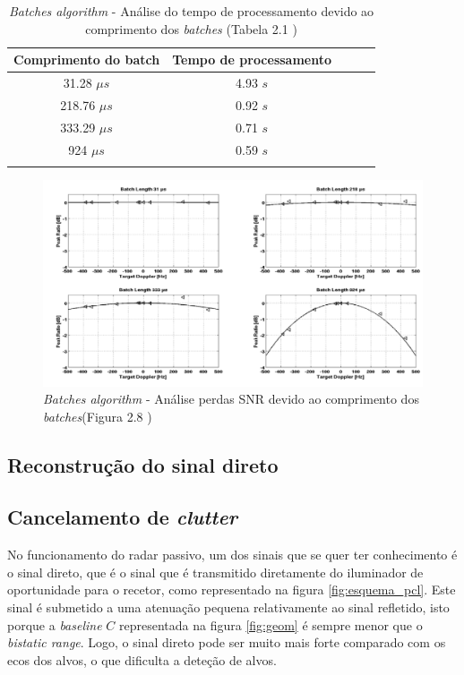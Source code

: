 \begin{table}[h]
\centering
\begin{tabular}{@{}ccccc@{}}
\toprule
Comprimento do batch & Tempo de processamento  \\ \midrule
31.28 $\mu s$        & 4.93 $s$                \\
218.76 $\mu s$       & 0.92 $s$                \\
333.29 $\mu s$       & 0.71 $s$                \\ 
924 $\mu s$          & 0.59 $s$                \\ \bottomrule
\label{tab:Tempo de processamento}
\end{tabular}
\caption[\textit{Batches algorithm} - tempo de processamento]{\textit{Batches algorithm} - Análise do tempo de processamento devido ao comprimento dos \textit{batches} (Tabela 2.1 \cite{Martorella})}
\end{table}

\begin{figure}[h]
\centering
\includegraphics[scale=0.5]{chapters/ch2/assets/bat_snr}
\caption[Perdas SNR]{\textit{Batches algorithm} - Análise perdas \gls{SNR} devido ao comprimento dos \textit{batches}(Figura 2.8 \cite{Martorella})}
\label{fig:bat_snr}
\end{figure}


\subsection{Reconstrução do sinal direto}



\subsection{Cancelamento de \textit{clutter}}
No funcionamento do radar passivo, um dos sinais que se quer ter conhecimento é o sinal direto, que é o sinal que é transmitido diretamente do iluminador de oportunidade para o recetor, como representado na figura \ref{fig:esquema_pcl}. Este sinal é submetido a uma atenuação  %
pequena relativamente ao sinal refletido, isto porque a \textit{baseline} $C$ representada na figura \ref{fig:geom} é sempre menor que o \textit{bistatic range}. Logo, o sinal direto pode ser muito mais forte comparado com os ecos dos alvos, o que dificulta a deteção de alvos.\par 

